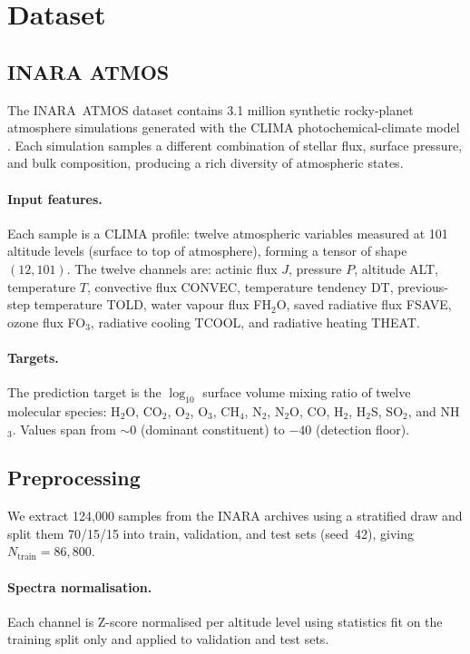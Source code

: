 \documentclass[11pt]{article}
\begin{document}
\section{Dataset}
\label{sec:data}

\subsection{INARA ATMOS}

The INARA~ATMOS dataset \citep{zorzan2025} contains 3.1 million synthetic
rocky-planet atmosphere simulations generated with the CLIMA
photochemical-climate model \citep{arney2016}. Each simulation samples a
different combination of stellar flux, surface pressure, and bulk composition,
producing a rich diversity of atmospheric states.

\paragraph{Input features.}
Each sample is a CLIMA profile: twelve atmospheric variables measured at 101
altitude levels (surface to top of atmosphere), forming a tensor of shape
$(12, 101)$. The twelve channels are: actinic flux $J$, pressure $P$,
altitude ALT, temperature $T$, convective flux CONVEC, temperature tendency DT,
previous-step temperature TOLD, water vapour flux FH$_2$O, saved radiative
flux FSAVE, ozone flux FO$_3$, radiative cooling TCOOL, and radiative heating
THEAT.

\paragraph{Targets.}
The prediction target is the $\log_{10}$ surface volume mixing ratio of twelve
molecular species: H$_2$O, CO$_2$, O$_2$, O$_3$, CH$_4$, N$_2$, N$_2$O,
CO, H$_2$, H$_2$S, SO$_2$, and NH$_3$. Values span from $\sim$0 (dominant
constituent) to $-40$ (detection floor).

\subsection{Preprocessing}

We extract 124{,}000 samples from the INARA archives using a stratified draw
and split them 70/15/15 into train, validation, and test sets (seed~42), giving
$N_{\text{train}} = 86{,}800$.

\paragraph{Spectra normalisation.} Each channel is Z-score normalised
per altitude level using statistics fit on the training split only and applied
to validation and test sets.
\end{document}
